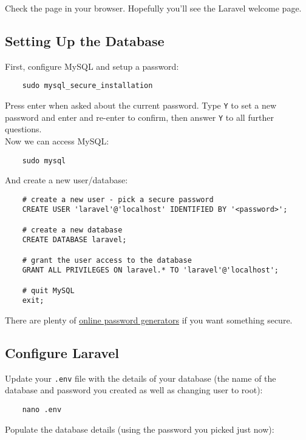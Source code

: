Check the page in your browser. Hopefully you'll see the Laravel welcome page.


\subsection{Setting Up the Database}

First, configure MySQL and setup a password:

\begin{verbatim}
    sudo mysql_secure_installation
\end{verbatim}

Press enter when asked about the current password. Type \texttt{Y} to set a new password and enter and re-enter to confirm, then answer \texttt{Y} to all further questions.
\\

Now we can access MySQL:

\begin{verbatim}
    sudo mysql
\end{verbatim}

And create a new user/database:

\begin{verbatim}
    # create a new user - pick a secure password
    CREATE USER 'laravel'@'localhost' IDENTIFIED BY '<password>';

    # create a new database
    CREATE DATABASE laravel;

    # grant the user access to the database
    GRANT ALL PRIVILEGES ON laravel.* TO 'laravel'@'localhost';

    # quit MySQL
    exit;
\end{verbatim}

There are plenty of \href{https://generatepasswords.org}{online password generators} if you want something secure.

\subsection{Configure Laravel}

Update your \texttt{.env} file with the details of your database (the name of the database and password you created as well as changing user to root):

\begin{verbatim}
    nano .env
\end{verbatim}

Populate the database details (using the password you picked just now):


